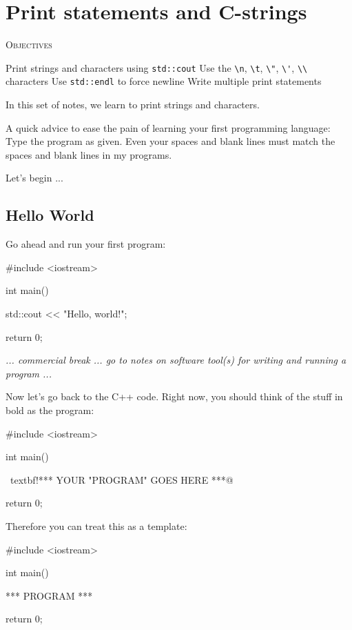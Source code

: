 \chapter{Print statements and C-strings}


\textsc{Objectives}
\begin{tightlist}
\li Print strings and characters using \verb!std::cout!
\li Use the \verb!\n!, \verb!\t!, \verb!\"!, \verb!\'!, 
    \verb!\\! characters
\li Use \verb!std::endl! to force newline
\li Write multiple print statements
\end{tightlist}

In this set of notes, we learn to print strings and characters.

A quick advice to ease the pain of learning your first programming language: 
Type the program 
 as given. 
Even your spaces and blank lines must match the spaces 
and blank lines in my programs.

Let's begin ...


\newpage\section{Hello World}

Go ahead and run your first program:
\begin{console}
#include <iostream>

int main()
{
    std::cout << "Hello, world!\n";

    return 0;
}
\end{console}

{\it ... commercial break ... go to notes on software tool(s) for writing and 
running a program ...}

Now let's go back to the C++ code. Right now, you should think of the stuff in bold as the program:
\begin{console}[commandchars=\~\!\@]
#include <iostream>

int main()
{
    ~textbf!*** YOUR "PROGRAM" GOES HERE ***@

    return 0;
}
\end{console}


Therefore you can treat this as a template:


\begin{console}[commandchars=\~\!\@]
#include <iostream>

int main()
{

    *** PROGRAM ***

    return 0;
}
\end{console}

